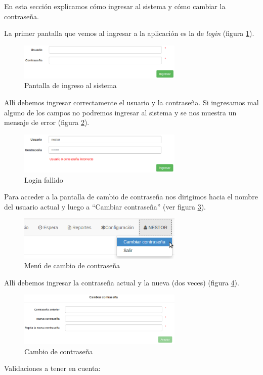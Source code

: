 En esta sección explicamos cómo ingresar al sistema y cómo cambiar la contraseña.

La primer pantalla que vemos al ingresar a la aplicación es la de \textit{login} (figura \ref{fig:login}).
\begin{figure}
\centerline{\includegraphics[width=0.7\textwidth]{login.png}}
\caption{Pantalla de ingreso al sistema}
\label{fig:login}
\end{figure}
Allí debemos ingresar correctamente el usuario y la contraseña. Si ingresamos mal alguno de los campos no podremos ingresar al sistema y se nos muestra un mensaje de error (figura \ref{fig:login_fallido}).
\begin{figure}
\centerline{\includegraphics[width=0.7\textwidth]{login_fallido.png}}
\caption{Login fallido}
\label{fig:login_fallido}
\end{figure}

\label{cap:cambio_pass}
Para acceder a la pantalla de cambio de contraseña nos dirigimos hacia el nombre del usuario actual y luego a ``Cambiar contraseña'' (ver figura \ref{fig:menu_cambio_pass}).
\begin{figure}
\centerline{\includegraphics[width=0.7\textwidth]{menu_cambio_pass.png}}
\caption{Menú de cambio de contraseña}
\label{fig:menu_cambio_pass}
\end{figure}
Allí debemos ingresar la contraseña actual y la nueva (dos veces) (figura \ref{fig:cambio_pass}).
\begin{figure}
\centerline{\includegraphics[width=0.7\textwidth]{cambio_pass.png}}
\caption{Cambio de contraseña}
\label{fig:cambio_pass}
\end{figure}
Validaciones a tener en cuenta:

